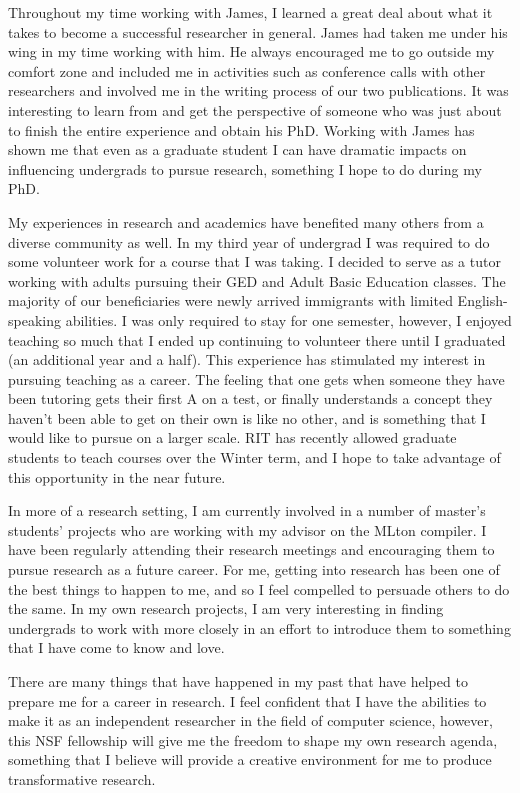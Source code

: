 \documentclass[12pt]{article}
\begin{document}
Throughout my time working with James, I learned a great deal about what it takes to become a successful researcher in general. James had taken me under his wing in my time working with him. He always encouraged me to go outside my comfort zone and included me in activities such as conference calls with other researchers and involved me in the writing process of our two publications. It was interesting to learn from and get the perspective of someone who was just about to finish the entire experience and obtain his PhD.  Working with James has shown me that even as a graduate student I can have dramatic impacts on influencing undergrads to pursue research, something I hope to do during my PhD.

My experiences in research and academics have benefited many others from a diverse community as well. In my third year of undergrad I was required to do some volunteer work for a course that I was taking. I decided to serve as a tutor working with adults pursuing their GED and Adult Basic Education classes. The majority of our beneficiaries were newly arrived immigrants with limited English-speaking abilities. I was only required to stay for one semester, however, I enjoyed teaching so much that I ended up continuing to volunteer there until I graduated (an additional year and a half). This experience has stimulated my interest in pursuing teaching as a career. The feeling that one gets when someone they have been tutoring gets their first A on a test, or finally understands a concept they haven't been able to get on their own is like no other, and is something that I would like to pursue on a larger scale.  RIT has recently allowed graduate students to teach courses over the Winter term, and I hope to take advantage of this opportunity in the near future.  

In more of a research setting, I am currently involved in a number of master's students' projects who are working with my advisor on the MLton compiler.  I have been regularly attending their research meetings and encouraging them to pursue research as a future career.  For me, getting into research has been one of the best things to happen to me, and so I feel compelled to persuade others to do the same. In my own research projects, I am very interesting in finding undergrads to work with more closely in an effort to introduce them to something that I have come to know and love.

There are many things that have happened in my past that have helped to prepare me for a career in research. I feel confident that I have the abilities to make it as an independent researcher in the field of computer science, however, this NSF fellowship will give me the freedom to shape my own research agenda, something that I believe will provide a creative environment for me to produce transformative research.
\vspace{-.5em}
\end{document}
